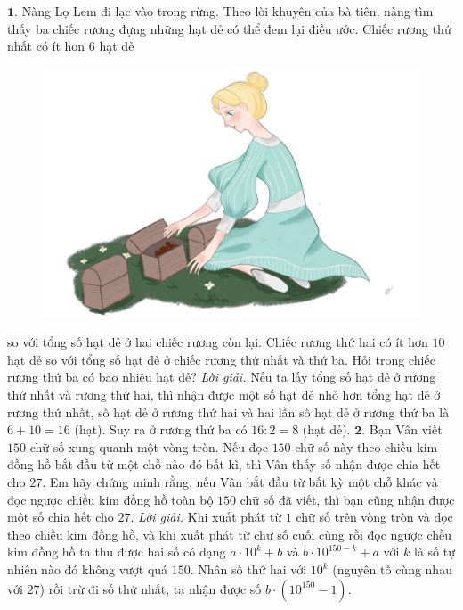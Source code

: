 \begin{multicols}{2}
	$\pmb{1.}$ Nàng Lọ Lem đi lạc vào trong rừng. Theo lời khuyên của bà tiên, nàng tìm thấy ba chiếc rương đựng những hạt dẻ có thể đem lại điều ước. Chiếc rương thứ nhất có ít hơn $6$ hạt dẻ
	\begin{figure}[H]
		\centering
		\vspace*{-5pt}
		\captionsetup{labelformat= empty, justification=centering}
		\includegraphics[width=1\linewidth]{Hinh1}
		\vspace*{-15pt}
	\end{figure}
	so với  tổng số hạt dẻ ở hai chiếc rương còn lại. Chiếc rương thứ hai có ít hơn $10$ hạt dẻ so với tổng số hạt dẻ ở chiếc rương thứ nhất và thứ ba. Hỏi trong chiếc rương thứ ba có bao nhiêu hạt dẻ?
	\vskip 0.1cm
	\textit{Lời giải.} 	Nếu ta lấy tổng số hạt dẻ ở rương thứ nhất và rương thứ hai, thì nhận được một số hạt dẻ nhỏ hơn tổng hạt dẻ ở rương thứ nhất, số hạt dẻ ở rương thứ hai và hai lần số hạt dẻ ở rương thứ ba là $6+10=16$ (hạt).
	\vskip 0.1cm
	Suy ra ở rương thứ ba có $16:2= 8$ (hạt dẻ).
	\vskip 0.1cm
	$\pmb{2.}$ Bạn Vân viết $150$ chữ số xung quanh một vòng tròn. Nếu đọc $150$ chữ số này theo chiều kim đồng hồ bắt đầu từ một chỗ nào đó bất kì, thì Vân thấy số nhận được chia hết cho $27$. Em hãy chứng minh rằng, nếu Vân bắt đầu từ bất kỳ một chỗ khác và đọc ngược chiều kim đồng hồ toàn bộ $150$ chữ số đã viết, thì bạn cũng nhận được một số chia hết cho $27$.
	\vskip 0.1cm
	\textit{Lời giải.} Khi xuất phát từ $1$ chữ số trên vòng tròn và đọc theo chiều kim đồng hồ, và khi xuất phát từ chữ số cuối cùng rồi đọc ngược chều kim đồng hồ ta thu được hai số có dạng $a\cdot10^k+b$  và $b\cdot 10^{150-k}+a$  với $k$ là số tự nhiên nào đó không vượt quá $150$. Nhân số thứ hai với $10^k$ (nguyên tố cùng nhau với $27$) rồi trừ đi số thứ nhất, ta nhận được số $b\cdot(10^{150}-1)$.

\end{multicols}
